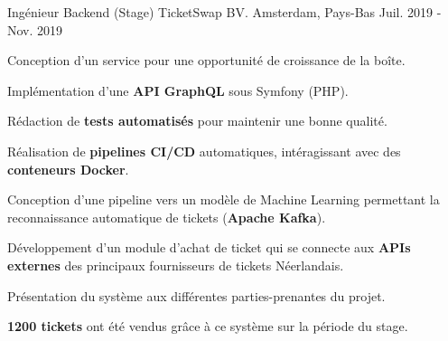 

\begin{cventries}

  \cventry
    {Ingénieur Backend (Stage)} %
    {TicketSwap BV.} %
    {Amsterdam, Pays-Bas} %
    {Juil. 2019 - Nov. 2019} %
    {
      \begin{cvitems} %
        \item {Conception d'un service pour une opportunité de croissance de la boîte.}
        \item {Implémentation d'une \textbf{API GraphQL} sous Symfony (PHP).}
        \item {Rédaction de \textbf{tests automatisés} pour maintenir une bonne qualité.}
        \item {Réalisation de \textbf{pipelines CI/CD} automatiques, intéragissant avec des \textbf{conteneurs Docker}.}
        \item {Conception d'une pipeline vers un modèle de Machine Learning permettant la reconnaissance automatique de tickets (\textbf{Apache Kafka}).}
        \item {Développement d'un module d'achat de ticket qui se connecte aux \textbf{APIs externes} des principaux fournisseurs de tickets Néerlandais.}
        \item {Présentation du système aux différentes parties-prenantes du projet.}
        \item {\textbf{1200 tickets} ont été vendus grâce à ce système sur la période du stage.}
      \end{cvitems}
    }

\end{cventries}
